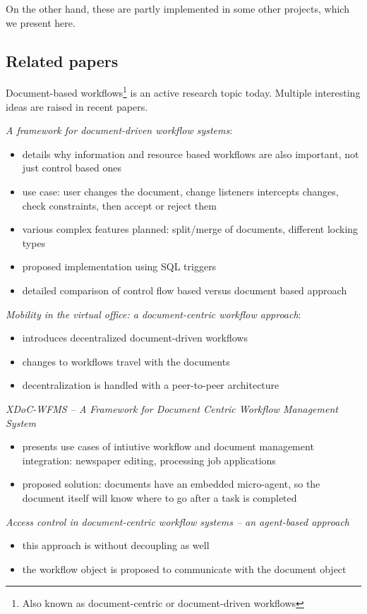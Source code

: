 On the other hand, these are partly implemented in some other projects, which we present here.

\subsection*{Related papers}

Document-based workflows\footnote{Also known as document-centric or
document-driven workflows} is an active research topic today. Multiple
interesting ideas are raised in recent papers.

\emph{A framework for document-driven workflow systems}\cite{paper-framework}:
\begin{itemize}
\item details why information and resource based workflows are also important, not just control based ones
\item use case: user changes the document, change listeners intercepts changes, check constraints, then accept or reject them
\item various complex features planned: split/merge of documents, different locking types
\item proposed implementation using SQL triggers
\item detailed comparison of control flow based versus document based approach
\end{itemize}

\emph{Mobility in the virtual office: a document-centric workflow approach}\cite{paper-mobility}:
\begin{itemize}
\item introduces decentralized document-driven workflows
\item changes to workflows travel with the documents
\item decentralization is handled with a peer-to-peer architecture
\end{itemize}

\emph{XDoC-WFMS -- A Framework for Document Centric Workflow Management System}\cite{paper-xdoc}
\begin{itemize}
\item presents use cases of intiutive workflow and document management integration: newspaper editing, processing job applications
\item proposed solution: documents have an embedded micro-agent, so the document itself will know where to go after a task is completed
\end{itemize}

\emph{Access control in document-centric workflow systems -- an agent-based approach}\cite{paper-access}
\begin{itemize}
\item this approach is without decoupling as well
\item the workflow object is proposed to communicate with the document object
\end{itemize}
